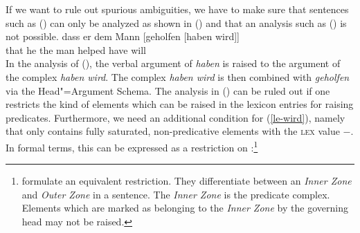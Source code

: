 {{If we want to rule out spurious ambiguities, we have to make sure that sentences such as () can only be analyzed
as shown in () and that an analysis such as () is not possible.
\ea
\label{bsp-non-complex-forming}
\gll dass er dem Mann [geholfen [haben wird]]\\
     that he the man  \spacebr{}helped have will\\

\z
%
In the analysis of (), the verbal argument of \emph{haben} is raised to the argument of the complex \emph{haben wird}.
The complex \emph{haben wird} is then combined with \emph{geholfen} via the Head"=Argument Schema. The analysis in ()
can be ruled out if one restricts the kind of elements which can be raised in the lexicon entries for raising predicates.
Furthermore, we need an additional condition for (\ref{le-wird}), namely that  only
contains fully saturated, non-predicative elements with the \textsc{lex} value $-$. In formal terms, this can be expressed as a restriction on :\footnote{
		\citet{BvN98} formulate an equivalent restriction. They differentiate between an
		\emph{Inner Zone} and \emph{Outer Zone} in a sentence. The \emph{Inner Zone} 
		is the predicate complex. Elements which are marked as belonging to the \emph{Inner Zone}
		by the governing head may not be raised.

}}}
